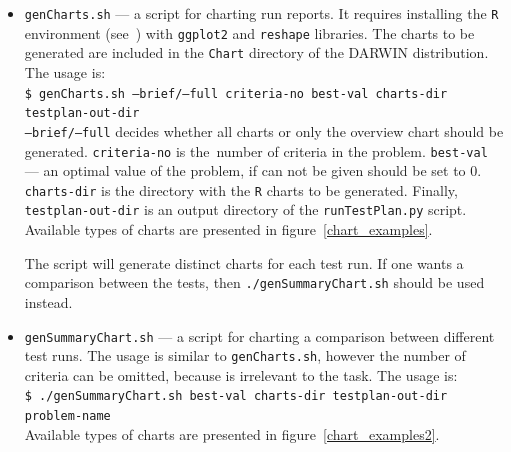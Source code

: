 \begin{itemize}
\item \texttt{genCharts.sh} --- a script for charting run reports. It requires
  installing the \texttt{R} environment (see~\cite{kee10}) with
  \texttt{ggplot2} and \texttt{reshape} libraries. The charts to be generated
  are included in the
  \texttt{Chart} directory of the DARWIN distribution. The usage is: \\
  \texttt{\$ genCharts.sh --brief/--full criteria-no best-val charts-dir
    testplan-out-dir} \\
  \texttt{--brief/--full} decides whether all charts or only the overview
  chart should be generated. \texttt{criteria-no} is the~number of criteria in
  the problem. \texttt{best-val} --- an optimal value of the problem, if can
  not be given should be set to $0$. \texttt{charts-dir} is the directory with
  the \texttt{R} charts to be generated. Finally, \texttt{testplan-out-dir} is
  an output directory of the \texttt{runTestPlan.py} script. Available types
  of charts are presented in figure~\ref{chart_examples}.

  The script will generate distinct charts for each test run. If one wants a
  comparison between the tests, then \texttt{./genSummaryChart.sh} should be
  used instead.

\item \texttt{genSummaryChart.sh} --- a script for charting a comparison
  between different test runs. The usage is similar to \texttt{genCharts.sh},
  however the number of criteria can be omitted, because is irrelevant to the
  task. The usage is: \\
  \texttt{\$ ./genSummaryChart.sh best-val charts-dir testplan-out-dir
    problem-name}\\
  Available types of charts are presented in figure~\ref{chart_examples2}.



\end{itemize}


